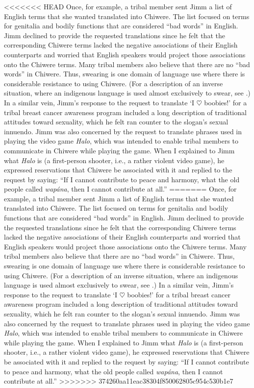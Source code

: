 \documentclass[output=paper]{LSP/langsci}
\begin{document}
<<<<<<< HEAD
Once, for example, a tribal member sent Jimm a list of English terms that she wanted translated into Chiwere. The list focused on terms for genitalia and bodily functions that are considered ``bad words'' in English. Jimm declined to provide the requested translations since he felt that the corresponding Chiwere terms lacked the negative associations of their English counterparts and worried that English speakers would project those associations onto the Chiwere terms. Many tribal members also believe that there are no ``bad words'' in Chiwere. Thus, swearing is one domain of language use where there is considerable resistance to using Chiwere. (For a description of an inverse situation, where an indigenous language is used almost exclusively to swear, see \citealt{Muehlmann2008}.) In a similar vein, Jimm's response to the request to translate `I $\heartsuit$ boobies!' for a tribal breast cancer awareness program included a long description of traditional attitudes toward sexuality, which he felt ran counter to the slogan's sexual innuendo. Jimm was also concerned by the request to translate phrases used in playing the video game \emph{Halo}, which was intended to enable tribal members to communicate in Chiwere while playing the game. When I explained to Jimm what \emph{Halo} is (a first-person shooter, i.e., a rather violent video game), he expressed reservations that Chiwere be associated with it and replied to the request by saying: ``If I cannot contribute to peace and harmony, what the old people called \emph{wapána}, then I cannot contribute at all.''
=======
Once, for example, a tribal member sent Jimm a list of English terms that she wanted translated into Chiwere. The list focused on terms for genitalia and bodily functions that are considered ``bad words'' in English. Jimm declined to provide the requested translations since he felt that the corresponding Chiwere terms lacked the negative associations of their English counterparts and worried that English speakers would project those associations onto the Chiwere terms. Many tribal members also believe that there are no ``bad words'' in Chiwere. Thus, swearing is one domain of language use where there is considerable resistance to using Chiwere. (For a description of an inverse situation, where an indigenous language is used almost exclusively to swear, see \citealt{Muehlmann2008}.) In a similar vein, Jimm's response to the request to translate `I $\heartsuit$ boobies!' for a tribal breast cancer awareness program included a long description of traditional attitudes toward sexuality, which he felt ran counter to the slogan's sexual innuendo. Jimm was also concerned by the request to translate phrases used in playing the video game \emph{Halo}, which was intended to enable tribal members to communicate in Chiwere while playing the game. When I explained to Jimm what \emph{Halo} is (a first-person shooter, i.e., a rather violent video game), he expressed reservations that Chiwere be associated with it and replied to the request by saying: ``If I cannot contribute to peace and harmony, what the old people called \emph{wap\'ana}, then I cannot contribute at all.''
>>>>>>> 374260aa11eac38304f850062805c954c530b1e7
\end{document}
